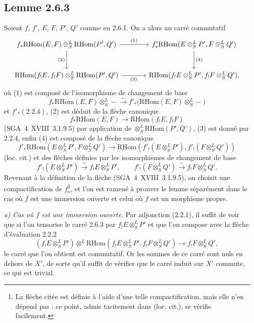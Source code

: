 \documentclass[11pt]{article}
\providecommand{\RHom}{\mathrm{RHom}}
\providecommand{\RHom}{\mathrm{RHom}}
\providecommand{\RHom}{\mathrm R\mathcal{H}om}
\providecommand{\RHom}{\mathrm{RHom}}
\begin{document}
\subsection*{Lemme 2.6.3}
Soient $f$, $f'$, $E$, $F$, $P'$, $Q'$ comme en 2.6.1. On a alors un carré commutatif
\[
\begin{tikzcd}[column sep=large,row sep=large]
f_*\RHom(E,F)\otimes^L_S\RHom(P',Q') \arrow[r,"(1)"] \arrow[d,"(2)"'] & f'_*\RHom(E\otimes^L_SP',F\otimes^L_SQ') \arrow[d,"(4)"]\\
\RHom(f_!E,f_!F)\otimes^L_S\RHom(P',Q') \arrow[r,"(3)"'] & \RHom(f_!E\otimes^L_SP',f_!F\otimes^L_SQ'),
\end{tikzcd}
\]
où (1) est composé de l'isomorphisme de changement de base
\[
f_*\RHom(E,F)\otimes^L_S -\xrightarrow{\sim}f'_*\bigl(\RHom(E,F)\otimes^L_S-\bigr)
\]
et $f'_*(2.2.4)$, (2) est déduit de la flèche canonique
\[
f_*\RHom(E,F)\longrightarrow\RHom(f_!E,f_!F)
\]
(SGA~4~XVIII~3.1.9.5) par application de $\otimes^L_S\RHom(P',Q')$, (3) est donné par 2.2.4, enfin (4) est composé de la flèche canonique
\[
f'_*\RHom(E\otimes^L_SP',F\otimes^L_SQ')
\longrightarrow
\RHom(f'_!(E\otimes^L_SP'),f'_!(F\otimes^L_SQ'))
\]
(loc. cit.) et des flèches définies par les isomorphismes de changement de base
\[
f'_!(E\otimes^L_SP')\xrightarrow{\sim}f_!E\otimes^L_SP',
\qquad
f'_!(F\otimes^L_SQ')\xrightarrow{\sim}f_!F\otimes^L_SQ'.
\]
Revenant à la définition de la flèche (SGA~4~XVIII~3.1.9.5), on choisit une compactification de $f$\footnote{La flèche citée est définie à l'aide d'une telle compactification, mais elle n'en dépend pas : ce point, admis tacitement dans (loc. cit.), se vérifie facilement.}, et l'on est ramené à prouver le lemme séparément dans le cas où $f$ est une immersion ouverte et celui où $f$ est un morphisme propre.

\emph{a) Cas où $f$ est une immersion ouverte.} Par adjonction (2.2.1), il suffit de voir que si l'on tensorise le carré 2.6.3 par $f_!E\otimes^L_SP'$ et que l'on compose avec la flèche d'évaluation 2.2.2
\[
(f_!E\otimes^L_SP')\otimes^L\RHom(f_!E\otimes^L_SP',f_!F\otimes^L_SQ')\longrightarrow f_!F\otimes^L_SQ',
\]
le carré que l'on obtient est commutatif. Or les sommes de ce carré sont nuls en dehors de $X'$, de sorte qu'il suffit de vérifier que le carré induit sur $X'$ commute, ce qui est trivial.
\end{document}
